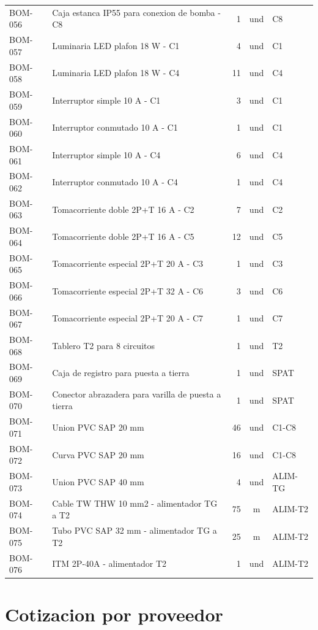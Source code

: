 \begin{longtable}{p{1.7cm}p{7.5cm}r c p{2.2cm}}
BOM-056 & Caja estanca IP55 para conexion de bomba - C8 & 1 & und & C8 \\
BOM-057 & Luminaria LED plafon 18 W - C1 & 4 & und & C1 \\
BOM-058 & Luminaria LED plafon 18 W - C4 & 11 & und & C4 \\
BOM-059 & Interruptor simple 10 A - C1 & 3 & und & C1 \\
BOM-060 & Interruptor conmutado 10 A - C1 & 1 & und & C1 \\
BOM-061 & Interruptor simple 10 A - C4 & 6 & und & C4 \\
BOM-062 & Interruptor conmutado 10 A - C4 & 1 & und & C4 \\
BOM-063 & Tomacorriente doble 2P+T 16 A - C2 & 7 & und & C2 \\
BOM-064 & Tomacorriente doble 2P+T 16 A - C5 & 12 & und & C5 \\
BOM-065 & Tomacorriente especial 2P+T 20 A - C3 & 1 & und & C3 \\
BOM-066 & Tomacorriente especial 2P+T 32 A - C6 & 3 & und & C6 \\
BOM-067 & Tomacorriente especial 2P+T 20 A - C7 & 1 & und & C7 \\
BOM-068 & Tablero T2 para 8 circuitos & 1 & und & T2 \\
BOM-069 & Caja de registro para puesta a tierra & 1 & und & SPAT \\
BOM-070 & Conector abrazadera para varilla de puesta a tierra & 1 & und & SPAT \\
BOM-071 & Union PVC SAP 20 mm & 46 & und & C1-C8 \\
BOM-072 & Curva PVC SAP 20 mm & 16 & und & C1-C8 \\
BOM-073 & Union PVC SAP 40 mm & 4 & und & ALIM-TG \\
BOM-074 & Cable TW THW 10 mm2 - alimentador TG a T2 & 75 & m & ALIM-T2 \\
BOM-075 & Tubo PVC SAP 32 mm - alimentador TG a T2 & 25 & m & ALIM-T2 \\
BOM-076 & ITM 2P-40A - alimentador T2 & 1 & und & ALIM-T2 \\
\bottomrule\end{longtable}\normalsize

\section{Cotizacion por proveedor}
